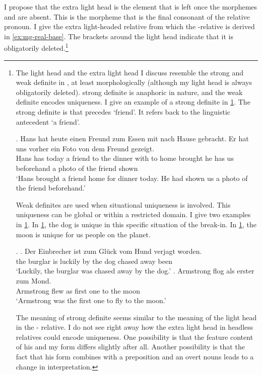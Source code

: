 I propose that the extra light head is the element that is left once the morphemes  and  are absent. This is the morpheme that is the final consonant of the relative pronoun. I give the extra light-headed relative from which the -relative is derived in \ref{ex:mg-real-base}. The brackets around the light head indicate that it is obligatorily deleted.\footnote{
The light head and the extra light head I discuss resemble the strong and weak definite in \citet{schwarz2009}, at least morphologically (although my light head is always obligatorily deleted).  strong definite is anaphoric in nature, and the weak definite encodes uniqueness. I give an example of a strong definite in \ref{ex:mg-florian-strong}. The strong definite is  that precedes  `friend'. It refers back to the linguistic antecedent  `a friend'.

\exg. Hans hat heute einen Freund zum Essen mit nach Hause gebracht. Er hat uns vorher ein Foto von dem Freund gezeigt.\\
Hans has today a friend {to the} dinner with to home brought he has us beforehand a photo of the friend shown\\
`Hans brought a friend home for dinner today. He had shown us a photo of the friend beforehand.'\label{ex:mg-florian-strong}

Weak definites are used when situational uniqueness is involved. This uniqueness can be global or within a restricted domain. I give two examples in \ref{ex:mg-florian-weak}. In \ref{ex:mg-florian-weak-hund}, the dog is unique in this specific situation of the break-in. In \ref{ex:mg-florian-weak-mond}, the moon is unique for us people on the planet.

\ex.\label{ex:mg-florian-weak}
\ag. Der Einbrecher ist {zum Glück} vom Hund verjagt worden.\\
the burglar is luckily {by the} dog {chased away} been\\
`Luckily, the burglar was chased away by the dog.'\label{ex:mg-florian-weak-hund}
\bg. Armstrong flog als erster zum Mond.\\
Armstrong flew as {first one} {to the} moon\\
`Armstrong was the first one to fly to the moon.' \label{ex:mg-florian-weak-mond}

The meaning of  strong definite seems similar to the meaning of the light head in the - relative.
I do not see right away how the extra light head in headless relatives could encode uniqueness. One possibility is that the feature content of his and my form differs slightly after all. Another possibility is that the fact that his form combines with a preposition and an overt nouns leads to a change in interpretation.
}

